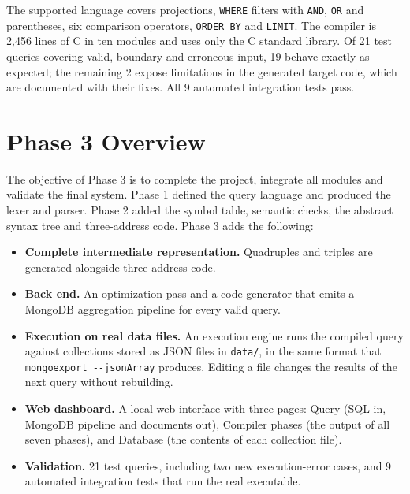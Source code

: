 \documentclass[12pt,a4paper]{report}
\newcommand{\codeus}{\textunderscore\allowbreak}
\DeclareRobustCommand{\code}[1]{\texttt{\let\_\codeus #1}}
\begin{document}
The supported language covers projections, \code{WHERE} filters with \code{AND}, \code{OR} and parentheses, six comparison operators, \code{ORDER BY} and \code{LIMIT}. The compiler is 2,456 lines of C in ten modules and uses only the C standard library. Of 21 test queries covering valid, boundary and erroneous input, 19 behave exactly as expected; the remaining 2 expose limitations in the generated target code, which are documented with their fixes. All 9 automated integration tests pass.

\clearpage
\tableofcontents
\clearpage

\chapter*{Phase 3 Overview}
The objective of Phase 3 is to complete the project, integrate all modules and validate the final system. Phase 1 defined the query language and produced the lexer and parser. Phase 2 added the symbol table, semantic checks, the abstract syntax tree and three-address code. Phase 3 adds the following:
\begin{itemize}
  \item \textbf{Complete intermediate representation.} Quadruples and triples are generated alongside three-address code.
  \item \textbf{Back end.} An optimization pass and a code generator that emits a MongoDB aggregation pipeline for every valid query.
  \item \textbf{Execution on real data files.} An execution engine runs the compiled query against collections stored as JSON files in \code{data/}, in the same format that \code{mongoexport -{}-jsonArray} produces. Editing a file changes the results of the next query without rebuilding.
  \item \textbf{Web dashboard.} A local web interface with three pages: Query (SQL in, MongoDB pipeline and documents out), Compiler phases (the output of all seven phases), and Database (the contents of each collection file).
  \item \textbf{Validation.} 21 test queries, including two new execution-error cases, and 9 automated integration tests that run the real executable.
\end{itemize}

\cleardoublepage
{}
\end{document}
